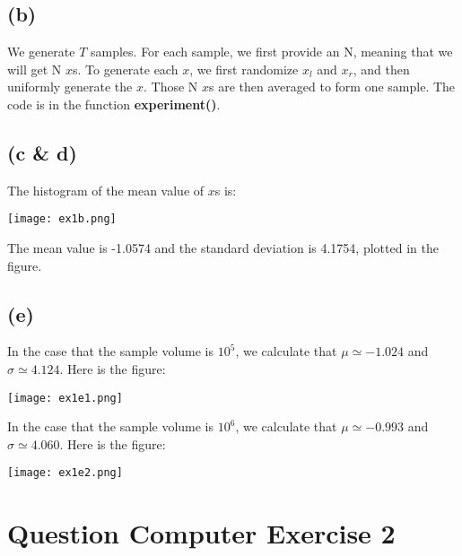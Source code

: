 \documentclass{article}
\newcommand{\question}[1]{\section*{Question #1}}
\renewcommand{\part}[1]{\subsection*{(#1)}}
\begin{document}
\part{b}
  We generate $T$ samples. For each sample, we first provide an N, meaning that we will get N $x$s. To generate each $x$, we first randomize $x_l$ and $x_r$, and then uniformly generate the $x$. Those N $x$s are then averaged to form one sample. The code is in the function \textbf{experiment()}.
\part{c \& d}
  The histogram of the mean value of $x$s is:
  \begin{center}
    \texttt{[image: ex1b.png]}
  \end{center} \par
The mean value is -1.0574 and the standard deviation is 4.1754, plotted in the figure.
\part{e}
In the case that the sample volume is $10^5$, we calculate that $\mu \simeq -1.024$ and $\sigma \simeq 4.124$. Here is the figure:
\begin{center}
  \texttt{[image: ex1e1.png]}
\end{center} \par
In the case that the sample volume is $10^6$, we calculate that $\mu \simeq -0.993$ and $\sigma \simeq 4.060$. Here is the figure:
\begin{center}
  \texttt{[image: ex1e2.png]}
\end{center} \par

\question{Computer Exercise 2}
\end{document}
